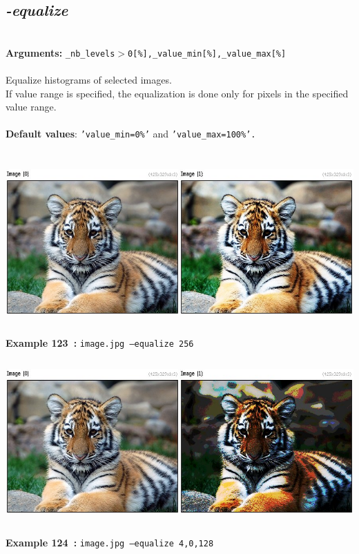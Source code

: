 \documentclass[a4paper,11pt,twoside]{book}
\begin{document}
\subsection{\emph{-equalize} }\vspace*{-0.5em}
~\\\textbf{Arguments: } 
{\small \texttt{\_nb\_levels$>$0[\%],\_value\_min[\%],\_value\_max[\%]}}\\~\\
Equalize histograms of selected images.
~\\If value range is specified, the equalization is done only for pixels in the specified
value range.
~\\~\\\textbf{Default values}: {\small \texttt{'value\_min=0\%'} and \texttt{'value\_max=100\%'.}}
\begin{center}\includegraphics[keepaspectratio=true,height=7cm,width=\textwidth]{img/gmic_def123.jpg}\\
{\footnotesize \textbf{Example 123~:} \texttt{image.jpg --equalize 256}}
\\\includegraphics[keepaspectratio=true,height=7cm,width=\textwidth]{img/gmic_def124.jpg}\\
{\footnotesize \textbf{Example 124~:} \texttt{image.jpg --equalize 4,0,128}}
\end{center}
\end{document}
